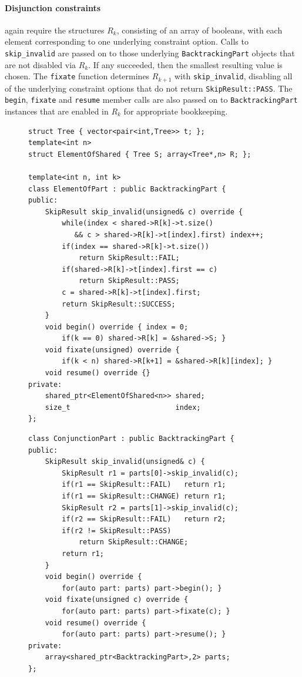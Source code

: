     \paragraph*{Disjunction constraints} again require the structures $R_k$,
    consisting of an array of booleans, with each element corresponding to one
    underlying constraint option.
    Calls to \texttt{skip\_invalid} are passed on to those underlying
    \texttt{BacktrackingPart} objects that are not disabled via $R_k$.
    If any succeeded, then the smallest resulting value is chosen.
    The {\tt fixate} function determines $R_{k+1}$ with \texttt{skip\_invalid},
    disabling all of the underlying constraint options that do not return
    {\tt SkipResult::PASS}.
    The \texttt{begin}, \texttt{fixate} and \texttt{resume} member calls are
    also passed on to {\tt BacktrackingPart} instances that are enabled in
    $R_k$ for appropriate bookkeeping.

\begin{figure}[p]
\begin{lstlisting}[language=MyCpp]
struct Tree { vector<pair<int,Tree>> t; };
template<int n>
struct ElementOfShared { Tree S; array<Tree*,n> R; };

template<int n, int k>
class ElementOfPart : public BacktrackingPart {
public:
    SkipResult skip_invalid(unsigned& c) override {
        while(index < shared->R[k]->t.size()
           && c > shared->R[k]->t[index].first) index++;
        if(index == shared->R[k]->t.size())
            return SkipResult::FAIL;
        if(shared->R[k]->t[index].first == c)
            return SkipResult::PASS;
        c = shared->R[k]->t[index].first;
        return SkipResult::SUCCESS;
    }
    void begin() override { index = 0;
        if(k == 0) shared->R[k] = &shared->S; }
    void fixate(unsigned) override {
        if(k < n) shared->R[k+1] = &shared->R[k][index]; }
    void resume() override {}
private:
    shared_ptr<ElementOfShared<n>> shared;
    size_t                         index;
};
\end{lstlisting}
\begin{lstlisting}[language=MyCpp, label={partimplementations}, caption=
   {{\tt BacktrackingPart} is implemented for element-of constraints and
    conjunction constraints.
    The struct {\tt ElementOfShared} corresponds to
    $\protect{(R_k[E_S](M,x))_{k=1\dots n}}$ in \Cref{theo:theo1}.}]
class ConjunctionPart : public BacktrackingPart {
public:
    SkipResult skip_invalid(unsigned& c) {
        SkipResult r1 = parts[0]->skip_invalid(c);
        if(r1 == SkipResult::FAIL)   return r1;
        if(r1 == SkipResult::CHANGE) return r1;
        SkipResult r2 = parts[1]->skip_invalid(c);
        if(r2 == SkipResult::FAIL)   return r2;
        if(r2 != SkipResult::PASS)
            return SkipResult::CHANGE;
        return r1;
    }
    void begin() override {
        for(auto part: parts) part->begin(); }
    void fixate(unsigned c) override {
        for(auto part: parts) part->fixate(c); }
    void resume() override {
        for(auto part: parts) part->resume(); }
private:
    array<shared_ptr<BacktrackingPart>,2> parts;
};
\end{lstlisting}
\end{figure}

